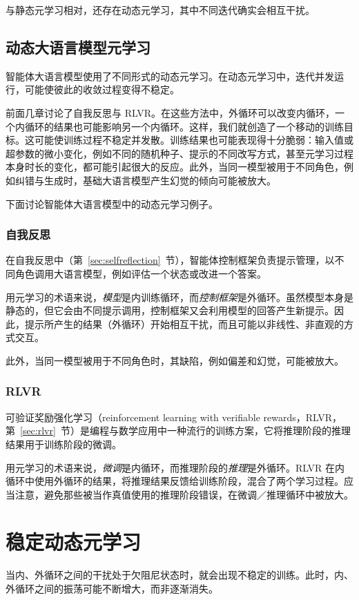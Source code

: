 与静态元学习相对，还存在动态元学习，其中不同迭代确实会相互干扰。

\subsection{动态大语言模型元学习}
智能体大语言模型使用了不同形式的动态元学习。在动态元学习中，迭代并发运行，可能使彼此的收敛过程变得不稳定。

前面几章讨论了自我反思与 RLVR。在这些方法中，外循环可以改变内循环，一个内循环的结果也可能影响另一个内循环。这样，我们就创造了一个移动的训练目标。这可能使训练过程不稳定并发散。训练结果也可能表现得十分脆弱：输入值或超参数的微小变化，例如不同的随机种子、提示的不同改写方式，甚至元学习过程本身时长的变化，都可能引起很大的反应。此外，当同一模型被用于不同角色，例如纠错与生成时，基础大语言模型产生幻觉的倾向可能被放大。

下面讨论智能体大语言模型中的动态元学习例子。

\subsubsection{自我反思}
在自我反思中（第~\ref{sec:selfreflection}~节），智能体控制框架负责提示管理，以不同角色调用大语言模型，例如评估一个状态或改进一个答案。

用元学习的术语来说，{\em 模型}是内训练循环，而{\em 控制框架}是外循环。虽然模型本身是静态的，但它会由不同提示调用，控制框架又会利用模型的回答产生新提示。因此，提示所产生的结果（外循环）开始相互干扰，而且可能以非线性、非直观的方式交互。

此外，当同一模型被用于不同角色时，其缺陷，例如偏差和幻觉，可能被放大。

\subsubsection{RLVR}
可验证奖励强化学习（reinforcement learning with verifiable rewards，RLVR，第~\ref{sec:rlvr}~节）是编程与数学应用中一种流行的训练方案，它将推理阶段的推理结果用于训练阶段的微调。

用元学习的术语来说，{\em 微调}是内循环，而推理阶段的{\em 推理}是外循环。RLVR 在内循环中使用外循环的结果，将推理结果反馈给训练阶段，混合了两个学习过程。应当注意，避免那些被当作真值使用的推理阶段错误，在微调／推理循环中被放大。

\section{稳定动态元学习}
当内、外循环之间的干扰处于欠阻尼状态时，就会出现不稳定的训练。此时，内、外循环之间的振荡可能不断增大，而非逐渐消失。

